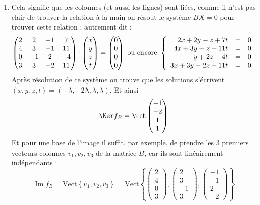 \documentclass[11pt,a4paper]{article}
\renewcommand{\Im}{\mathop{\mathrm{Im}}\nolimits}
\begin{document}
\begin{enumerate}
\begin{enumerate}
     \item Cela signifie que les colonnes (et aussi les lignes) sont liées, comme il n'est pas clair
de trouver la relation à la main on résout le système $B X = 0$ pour trouver cette relation ; autrement dit :
$$\begin{pmatrix} 
2 & 2 & -1 & 7  \cr
4 & 3 & -1 & 11 \cr
0 & -1 & 2 & -4 \cr
3 & 3 & -2 & 11 \cr 
\end{pmatrix}
\cdot 
\begin{pmatrix} x\\y\\z\\t \end{pmatrix} = 
\begin{pmatrix} 0\\0\\0\\0 \end{pmatrix}
\text{ ou encore }
\left\{ 
\begin{array}{rcl}
2x + 2y -z + 7t  &=& 0  \cr
4x + 3y -z + 11t &=& 0 \cr
     -y +2z -4t  &=& 0  \cr
3x + 3y -2z+ 11t &=& 0  \cr   
\end{array}
\right.$$
Après résolution de ce système on trouve que 
les solutions s'écrivent $(x,y,z,t)= (-\lambda,-2\lambda,\lambda,\lambda)$.
Et ainsi 
$$\Ker f_B = \textrm{Vect} \begin{pmatrix}-1\\-2\\1\\1\end{pmatrix}$$
Et pour une base de l'image il suffit, par exemple, de prendre les $3$ premiers vecteurs colonnes $v_1,v_2,v_3$ 
de la matrice $B$, car ils sont linéairement indépendants :
$$\Im f_B = \textrm{Vect} \left\{ v_1, v_2, v_3 \right\} = 
\textrm{Vect} \left\{  
\begin{pmatrix}2\\4\\0\\3\end{pmatrix},  
\begin{pmatrix}2\\3\\-1\\3\end{pmatrix},
\begin{pmatrix}-1\\-1\\2\\-2\end{pmatrix} 
\right\}
$$

  \end{enumerate}
\end{enumerate}
\end{document}
